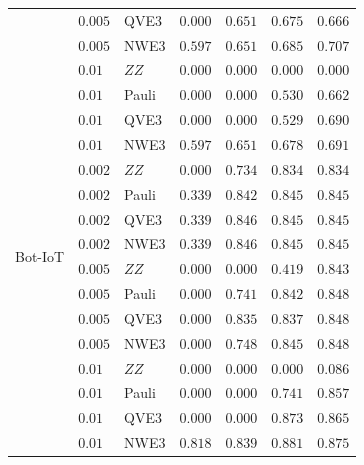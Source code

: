 \begin{table}[t]
\begin{tabular}{@{}lllrrrr@{}}
 & $0.005$ & QVE3 & $0.000$ & $0.651$ & $0.675$ & $0.666$ \\
 & $0.005$ & NWE3 & $0.597$ & $0.651$ & $0.685$ & $0.707$ \\
 & $0.01$ & $ZZ$ & $0.000$ & $0.000$ & $0.000$ & $0.000$ \\
 & $0.01$ & Pauli & $0.000$ & $0.000$ & $0.530$ & $0.662$ \\
 & $0.01$ & QVE3 & $0.000$ & $0.000$ & $0.529$ & $0.690$ \\
 & $0.01$ & NWE3 & $0.597$ & $0.651$ & $0.678$ & $0.691$ \\
\midrule
\multirow{8}{*}{Bot-IoT}
 & $0.002$ & $ZZ$ & $0.000$ & $0.734$ & $0.834$ & $0.834$ \\
 & $0.002$ & Pauli & $0.339$ & $0.842$ & $0.845$ & $0.845$ \\
 & $0.002$ & QVE3 & $0.339$ & $0.846$ & $0.845$ & $0.845$ \\
 & $0.002$ & NWE3 & $0.339$ & $0.846$ & $0.845$ & $0.845$ \\
 & $0.005$ & $ZZ$ & $0.000$ & $0.000$ & $0.419$ & $0.843$ \\
 & $0.005$ & Pauli & $0.000$ & $0.741$ & $0.842$ & $0.848$ \\
 & $0.005$ & QVE3 & $0.000$ & $0.835$ & $0.837$ & $0.848$ \\
 & $0.005$ & NWE3 & $0.000$ & $0.748$ & $0.845$ & $0.848$ \\
 & $0.01$ & $ZZ$ & $0.000$ & $0.000$ & $0.000$ & $0.086$ \\
 & $0.01$ & Pauli & $0.000$ & $0.000$ & $0.741$ & $0.857$ \\
 & $0.01$ & QVE3 & $0.000$ & $0.000$ & $0.873$ & $0.865$ \\
 & $0.01$ & NWE3 & $0.818$ & $0.839$ & $0.881$ & $0.875$ \\
\bottomrule
\end{tabular}
\end{table}
